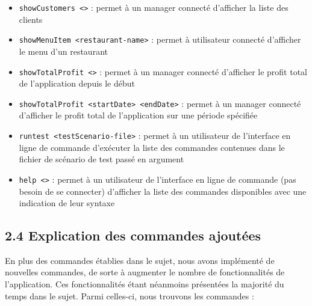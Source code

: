 \begin{itemize}
    \item \texttt{showCustomers <>} : permet à un manager connecté d'afficher la liste des clients\\
    \item \texttt{showMenuItem <restaurant-name>} : permet à utilisateur connecté d'afficher le menu d'un restaurant\\
    \item \texttt{showTotalProfit <>} : permet à un manager connecté d'afficher le profit total de l'application depuis le début\\
    \item \texttt{showTotalProfit <startDate> <endDate>} : permet à un manager connecté d'afficher le profit total de l'application sur une période spécifiée\\
    \item \texttt{runtest <testScenario-file>} : permet à un utilisateur de l'interface en ligne de commande d'exécuter la liste des commandes contenues dans le fichier de scénario de test passé en argument\\
    \item \texttt{help <>} : permet à un utilisateur de l'interface en ligne de commande (pas besoin de se connecter) d'afficher la liste des commandes disponibles avec une indication de leur syntaxe
\end{itemize}

\subsection*{2.4 Explication des commandes ajoutées}

En plus des commandes établies dans le sujet, nous avons implémenté de nouvelles commandes, de sorte à augmenter le nombre de fonctionnalités de l'application. Ces fonctionnalités étant néanmoins présentées la majorité du temps dans le sujet. Parmi celles-ci, nous trouvons les commandes :

